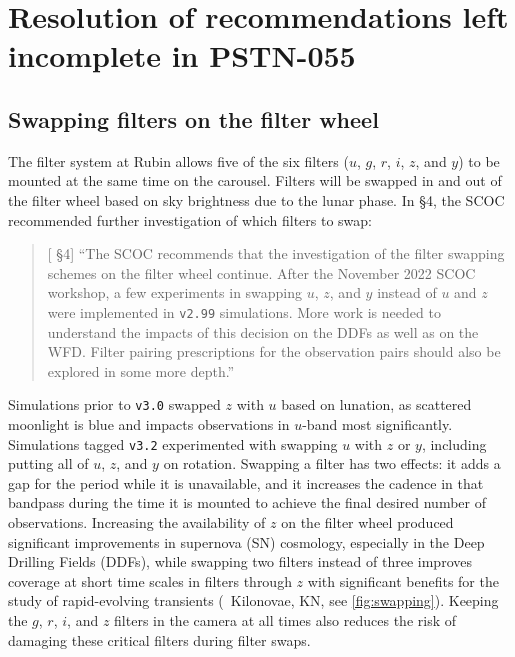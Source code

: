 
\clearpage

\section{Resolution of recommendations left incomplete in PSTN-055} \label{sec:openquestions}

\subsection{Swapping filters on the filter wheel}\label{sec:filterswap}
The filter system at Rubin allows five of the six filters ($u$, $g$, $r$, $i$, $z$, and $y$) to be mounted at the same time on the carousel. 
Filters will be swapped in and out of the filter wheel based on sky brightness due to the lunar phase. 
In  \S4, the SCOC recommended further investigation of which filters to swap: 
\begin{quote}
    {[ \S4] ``The SCOC recommends that the investigation of the filter swapping schemes on the filter wheel continue. After the November 2022 SCOC workshop, a few experiments in swapping $u$, $z$, and $y$ instead of $u$ and $z$ were implemented in \texttt{v2.99} simulations. More work is needed to understand the impacts of this decision on the DDFs as well as on the WFD. Filter pairing prescriptions for the observation pairs should also be explored in some more depth.''}
\end{quote}

 Simulations prior to \texttt{v3.0} swapped $z$ with $u$ based on lunation, as scattered moonlight is blue and impacts observations in $u$-band most significantly. Simulations tagged \texttt{v3.2}  experimented with  swapping $u$ with $z$ or $y$, including putting all of $u$, $z$, and $y$ on rotation. Swapping a filter has two effects: it adds a gap for the period while it is unavailable, and it increases the cadence in that bandpass during the time it is mounted to achieve the final desired number of observations. Increasing the availability of $z$ on the filter wheel produced significant improvements in supernova (SN) cosmology, especially in the Deep Drilling Fields (DDFs), while swapping two filters instead of three improves coverage at short time scales in filters through $z$ with significant benefits for the study of rapid-evolving transients (\eg\ Kilonovae, KN, see \autoref{fig:swapping}). Keeping the $g$, $r$, $i$, and $z$ filters in the camera at all times also reduces the risk of damaging these critical filters during filter swaps.
 
